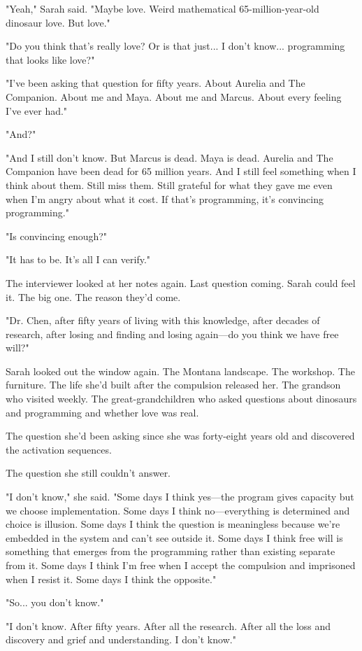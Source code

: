 "Yeah," Sarah said. "Maybe love. Weird mathematical 65-million-year-old dinosaur love. But love."

"Do you think that's really love? Or is that just... I don't know... programming that looks like love?"

"I've been asking that question for fifty years. About Aurelia and The Companion. About me and Maya. About me and Marcus. About every feeling I've ever had."

"And?"

"And I still don't know. But Marcus is dead. Maya is dead. Aurelia and The Companion have been dead for 65 million years. And I still feel something when I think about them. Still miss them. Still grateful for what they gave me even when I'm angry about what it cost. If that's programming, it's convincing programming."

"Is convincing enough?"

"It has to be. It's all I can verify."

The interviewer looked at her notes again. Last question coming. Sarah could feel it. The big one. The reason they'd come.

"Dr. Chen, after fifty years of living with this knowledge, after decades of research, after losing and finding and losing again—do you think we have free will?"

Sarah looked out the window again. The Montana landscape. The workshop. The furniture. The life she'd built after the compulsion released her. The grandson who visited weekly. The great-grandchildren who asked questions about dinosaurs and programming and whether love was real.

The question she'd been asking since she was forty-eight years old and discovered the activation sequences.

The question she still couldn't answer.

"I don't know," she said. "Some days I think yes—the program gives capacity but we choose implementation. Some days I think no—everything is determined and choice is illusion. Some days I think the question is meaningless because we're embedded in the system and can't see outside it. Some days I think free will is something that emerges from the programming rather than existing separate from it. Some days I think I'm free when I accept the compulsion and imprisoned when I resist it. Some days I think the opposite."

"So... you don't know."

"I don't know. After fifty years. After all the research. After all the loss and discovery and grief and understanding. I don't know."

